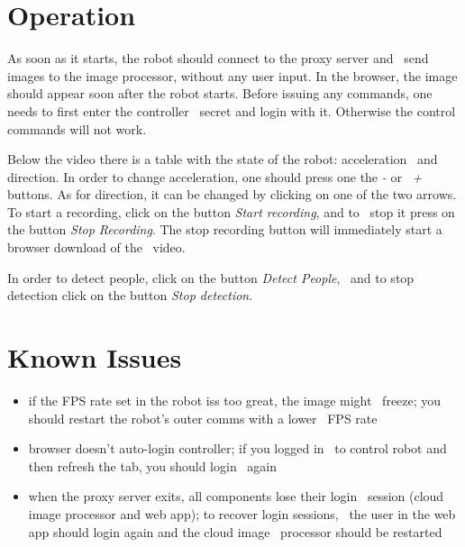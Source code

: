 \section{Operation}
\label{sec:user-manual-operation}
As soon as it starts, the robot should connect to the proxy server and \
send images to the image processor, without any user input.
In the browser, the image should appear soon after the robot starts.
Before issuing any commands, one needs to first enter the controller \
secret and login with it.
Otherwise the control commands will not work.

Below the video there is a table with the state of the robot: acceleration \
and direction.
In order to change acceleration, one should press one the \textit{-} or \
\textit{+} buttons.
As for direction, it can be changed by clicking on one of the two arrows.
To start a recording, click on the button \textit{Start recording}, and to \
stop it press on the button \textit{Stop Recording}.
The stop recording button will immediately start a browser download of the \
video.

In order to detect people, click on the button \textit{Detect People}, \
and to stop detection click on the button \textit{Stop detection}.

\section{Known Issues}
\label{sec:manual-known-issues}
\begin{itemize}
    \item if the FPS rate set in the robot iss too great, the image might \
        freeze; you should restart the robot's outer comms with a lower \
        FPS rate
    \item browser doesn't auto-login controller; if you logged in \
        to control robot and then refresh the tab, you should login \
        again
    \item when the proxy server exits, all components lose their login \
        session (cloud image processor and web app); to recover login sessions, \
        the user in the web app should login again and the cloud image \
        processor should be restarted
\end{itemize}